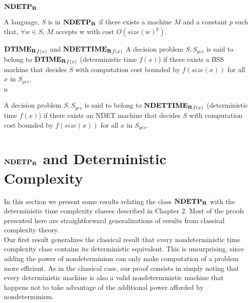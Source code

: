 \begin{definition} $\mathbf{NDETP_R}$
  
  A language, $S$ is in $\mathbf{NDETP_R}$ if there exists a machine $M$ and a
  constant $p$ such that, $\forall w \in S$, $M$ accepts w with cost
  $O(size(w)^p)$.
  
\end{definition}

\begin{definition} $\mathbf{DTIME_R}_{f(x)}$ and $\mathbf{NDETTIME_R}_{f(x)}$
  A decision problem $S, S_{yes}$ is said to belong to
  $\mathbf{DTIME_R}_{f(x)}$ (deterministic time $f(x)$) if there exists a BSS
  machine that decides $S$ with computation cost bounded by
  $f(size(x))$ for all $x$ in $S_{yes}$.  \\n
  
  A decision problem $S, S_{yes}$ is said to belong to
  $\mathbf{NDETTIME_R}_{f(x)}$ (deterministic time $f(x)$) if there exists an
  NDET machine that decides $S$ with computation cost bounded by
  $f(size(x))$ for all $x$ in $S_{yes}$.  \\
\end{definition}


\section{$\mathbf{NDETP_R}$ and Deterministic Complexity}

In this section we present some results relating the class $\mathbf{NDETP_R}$
with the deterministic time complexity classes described in Chapter 2.
Most of the proofs presented here are straightforward generalizations
of results from classical complexity theory.\\

Our first result generalizes the classical result that every
nondeterministic time complexity class contains its deterministic
equivalent.  This is unsurprising, since adding the power of
nondeterminism can only make computation of a problem more efficient.
As in the classical case, our proof consists in simply noting that
every deterministic machine is also a valid nondeterministic machine
that happens not to take advantage of the additional power afforded by
nondeterminism.


